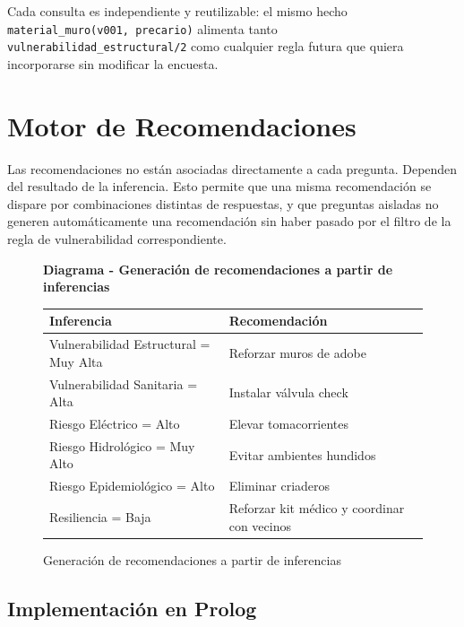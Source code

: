 \documentclass[12pt, letterpaper]{article}
\newcommand{\diagrambox}[3]{%
  \begin{figure}[H]
    \centering
    \begin{tcolorbox}[colback=white!90!blue, colframe=blue!60!black, width=\linewidth, arc=3mm, auto outer arc]
      \centering
      \textbf{Diagrama - #2} %
      \vspace{0.5cm}
      \parbox{0.95\linewidth}{\centering #3}
    \end{tcolorbox}
    \caption{#2}
    \label{fig:#1}
  \end{figure}
}
\begin{document}
Cada consulta es independiente y reutilizable: el mismo hecho \texttt{material\_muro(v001, precario)} alimenta tanto \texttt{vulnerabilidad\_estructural/2} como cualquier regla futura que quiera incorporarse sin modificar la encuesta.

\section{Motor de Recomendaciones}

Las recomendaciones no están asociadas directamente a cada pregunta. Dependen del resultado de la inferencia. Esto permite que una misma recomendación se dispare por combinaciones distintas de respuestas, y que preguntas aisladas no generen automáticamente una recomendación sin haber pasado por el filtro de la regla de vulnerabilidad correspondiente.

\diagrambox{generacion_recomendaciones}{Generación de recomendaciones a partir de inferencias}{
  \begin{tabular}{p{5cm} p{9cm}}
    \textbf{Inferencia} & \textbf{Recomendación} \\
    \hline
    Vulnerabilidad Estructural = Muy Alta & Reforzar muros de adobe \\
    Vulnerabilidad Sanitaria = Alta & Instalar válvula check \\
    Riesgo Eléctrico = Alto & Elevar tomacorrientes \\
    Riesgo Hidrológico = Muy Alto & Evitar ambientes hundidos \\
    Riesgo Epidemiológico = Alto & Eliminar criaderos \\
    Resiliencia = Baja & Reforzar kit médico y coordinar con vecinos
  \end{tabular}
}

\subsection{Implementación en Prolog}
\end{document}
